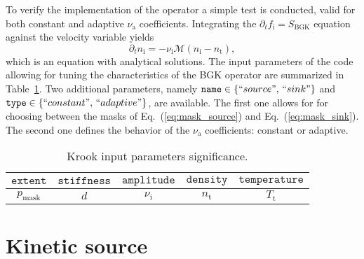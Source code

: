 \documentclass[11pt]{article}
\begin{document}
To verify the implementation of the operator a simple test is conducted, valid for both constant and adaptive $\nu_\mathrm{a}$ coefficients. Integrating the $\partial_t f_\mathrm{i}  = S_\mathrm{BGK}$ equation against the velocity variable yields
\[ \partial_{t} n_\mathrm{i} = - \nu_\mathrm{i} \mathcal{M} \left( n_\mathrm{i} - n_\mathrm{t} \right), \]
which is an equation with analytical solutions. The input parameters of the code allowing for tuning the characteristics of the BGK operator are summarized in Table~\ref{tab:input_para_krook}. Two additional parameters, namely $\texttt{name} \in \left\{ ``source", \, ``sink"\right\} $ and $\texttt{type} \in \left\{ ``constant", \, ``adaptive"\right\} $, are available. The first one allows for for choosing between the masks of Eq.~(\ref{eq:mask_source}) and Eq.~(\ref{eq:mask_sink}). The second one defines the behavior of the $\nu_\mathrm{a}$ coefficients: constant or adaptive.
%
\begin{table}
    \centering
\renewcommand{\arraystretch}{1.5}
\caption{\label{tab:input_para_krook}Krook input parameters significance.}
\vspace{2mm}
\begin{tabular}{c|c|c|c|c}
    $\texttt{extent}$ & $\texttt{stiffness}$ & $\texttt{amplitude}$ & $\texttt{density}$ &  $\texttt{temperature}$ \\
    \hline
    \hline
  $p_{\mathrm{mask}}$ & $d$ & $\nu_\mathrm{i}$ & $n_\mathrm{t}$ & $T_\mathrm{t}$ \\
\end{tabular}
\end{table}
%







\section{Kinetic source}
\label{sec:kinetic_source}
\end{document}
